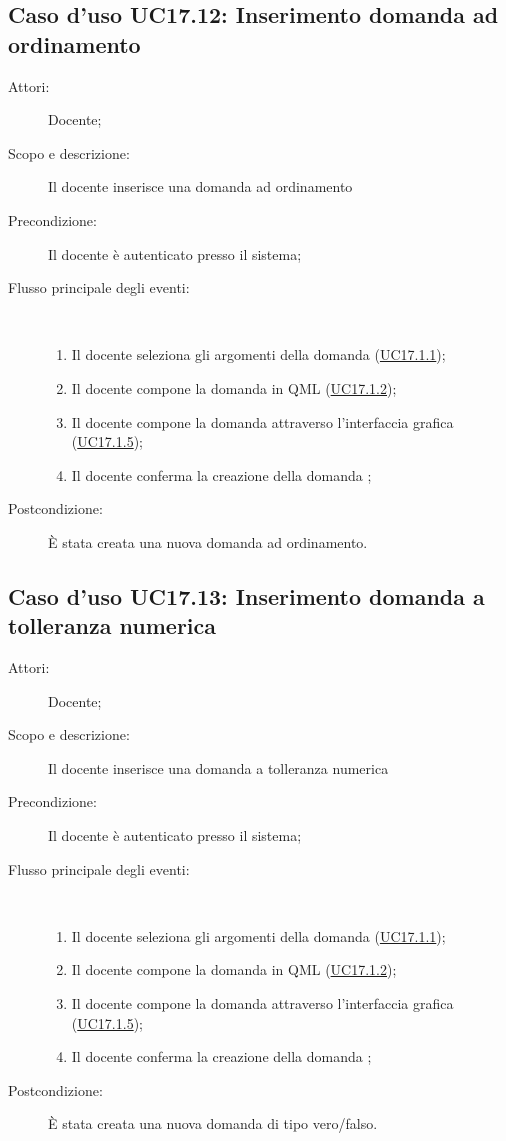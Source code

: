\subsection{Caso d'uso UC17.12: Inserimento domanda ad ordinamento}\begin{description}
	\item[Attori:] Docente;
	\item[Scopo e descrizione:] Il docente inserisce una domanda ad ordinamento
	\item[Precondizione:] Il docente è autenticato presso il sistema;
	
	\item[Flusso principale degli eventi:] \ 
	\begin{enumerate}
		\item Il docente seleziona gli argomenti della domanda	 (\hyperlink{UC17.1.1}{UC17.1.1});
		\item Il docente compone la domanda in QML (\hyperlink{UC17.1.2}{UC17.1.2});
		\item Il docente compone la domanda attraverso l'interfaccia grafica	 (\hyperlink{UC17.1.5}{UC17.1.5});
		\item Il docente conferma la creazione della domanda	;
		
	\end{enumerate}
	\item[Postcondizione:] È stata creata una nuova domanda ad ordinamento.
\end{description}
\hypertarget{UC17.13}{}
\subsection{Caso d'uso UC17.13: Inserimento domanda a tolleranza numerica }\begin{description}
	\item[Attori:] Docente;
	\item[Scopo e descrizione:] Il docente inserisce una domanda a tolleranza numerica
	\item[Precondizione:] Il docente è autenticato presso il sistema;
	
	\item[Flusso principale degli eventi:] \ 
	\begin{enumerate}
		\item Il docente seleziona gli argomenti della domanda	 (\hyperlink{UC17.1.1}{UC17.1.1});
		\item Il docente compone la domanda in QML (\hyperlink{UC17.1.2}{UC17.1.2});
		\item Il docente compone la domanda attraverso l'interfaccia grafica (\hyperlink{UC17.1.5}{UC17.1.5});
		\item Il docente conferma la creazione della domanda	;
		
	\end{enumerate}
	\item[Postcondizione:] È stata creata una nuova domanda di tipo vero/falso.
\end{description}
\hypertarget{UC18}{}
